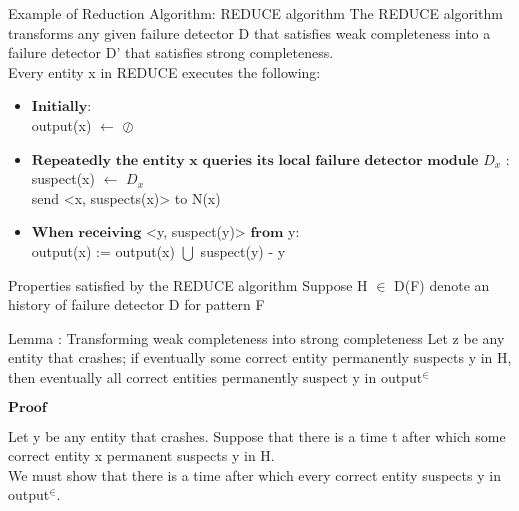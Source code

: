 \documentclass{beamer}
\begin{document}
\begin{frame}{Example of Reduction Algorithm: REDUCE algorithm}
The REDUCE algorithm transforms any given failure detector D that satisfies weak completeness into a failure detector D' that satisfies strong completeness.\\
Every entity x in REDUCE executes the following:
\small
\begin{itemize}
\item $\textbf{Initially}$: \\
output(x) $\leftarrow$ $\oslash$
\item $\textbf{Repeatedly}$ $\textbf{the entity}$ $\textbf{x queries}$ $\textbf{its local}$ $\textbf{failure}$ $\textbf{detector}$ $\textbf{module}$ $D_x$ : \\
suspect(x) $\leftarrow$ $D_x$ \\
send <x, suspects(x)> to N(x)\\
\item $\textbf{When}$ $\textbf{receiving}$ <y, suspect(y)> $\textbf{from}$ y:\\
output(x) := output(x) $\bigcup$ suspect(y) - {y}
\end{itemize}
\end{frame}

\begin{frame}{Properties satisfied by the REDUCE algorithm}
\small
Suppose H $\in$ D(F) denote an history of failure detector D for pattern F
\begin{block}{Lemma : \small Transforming weak completeness into strong completeness}
Let z be any entity that crashes; if eventually some correct entity permanently suspects y in H, then eventually all correct entities permanently suspect y in output$^{\in}$
\end{block}
\begin{flushleft}
$\textbf{Proof}$
\end{flushleft}
Let y be any entity that crashes. Suppose that there is a time t after which some correct entity x permanent suspects y in H.\\ We must show that there is a time after which every correct entity suspects y in output$^{\in}$. \\
\end{frame}
\end{document}
